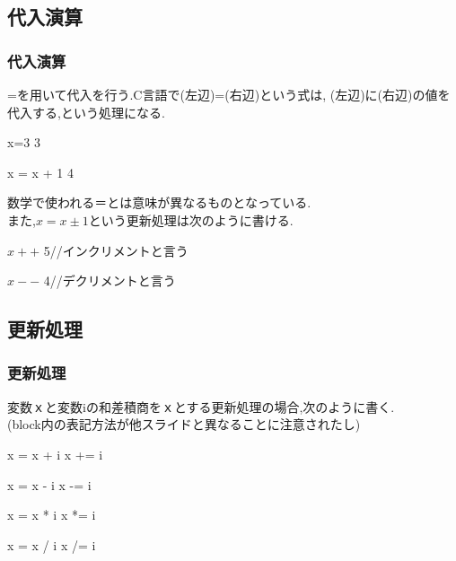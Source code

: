 \documentclass[dvipdfmx]{beamer}
\begin{document}
\subsection{代入演算}
\begin{frame}[t, label=17]
    \frametitle{代入演算}
    =を用いて代入を行う.C言語で(左辺)=(右辺)という式は,
    (左辺)に(右辺)の値を代入する,という処理になる.
    \begin{block}{x=3}
        3
    \end{block}
    \begin{block}{x = x + 1}
        4
    \end{block}
    数学で使われる＝とは意味が異なるものとなっている.\\
    また,$x=x\pm 1$という更新処理は次のように書ける.
    \begin{block}{$x++$}
        5\qquad //インクリメントと言う
    \end{block}
    \begin{block}{$x--$}
        4\qquad //デクリメントと言う
    \end{block}
    \vfill \hfill 
    \hyperlink{16}{}
    \space
    \hyperlink{18}{}
\end{frame}

\subsection{更新処理}
\begin{frame}[t, label=18]
    \frametitle{更新処理}
    変数ｘと変数iの和差積商をｘとする更新処理の場合,次のように書く.\\
    (block内の表記方法が他スライドと異なることに注意されたし)
    \begin{exampleblock}{x = x + i}
        x += i 
    \end{exampleblock}
    \begin{exampleblock}{x = x - i}
        x -= i
    \end{exampleblock}
    \begin{exampleblock}{x = x * i}
        x *= i
    \end{exampleblock}
    \begin{exampleblock}{x = x / i}
        x /= i
    \end{exampleblock}
    \vfill \hfill 
    \hyperlink{17}{}
    \space
    \hyperlink{19}{}
\end{frame}
\end{document}
